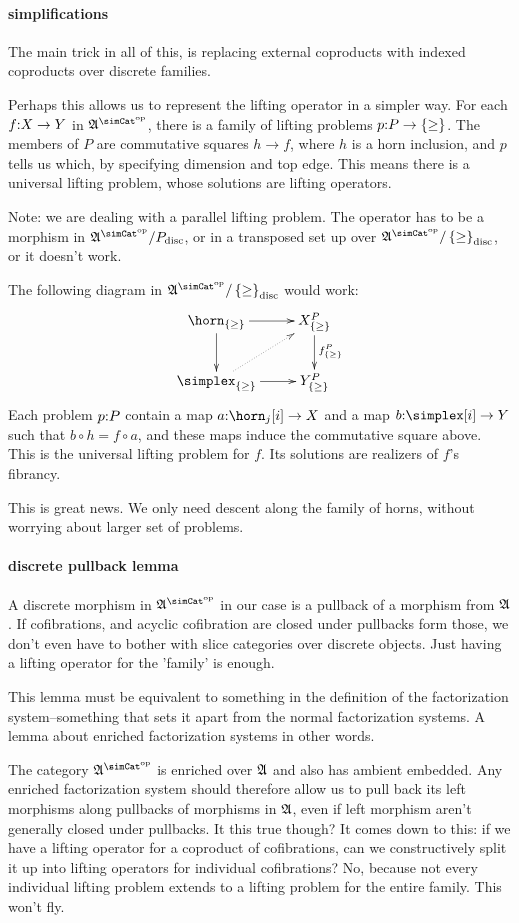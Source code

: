 \documentclass[csh.tex]{subfiles}
\begin{document}
\paragraph{simplifications}
The main trick in all of this, is replacing external coproducts with indexed coproducts over discrete families.

Perhaps this allows us to represent the lifting operator in a simpler way. For each $f\mathord : X\to Y$ in $\ambient\s$, there is a family of lifting problems $p\mathord : P\to \left\{\geq\right\}$. The members of $P$ are commutative squares $h\to f$, where $h$ is a horn inclusion, and $p$ tells us which, by specifying dimension and top edge. This means there is a universal lifting problem, whose solutions are lifting operators.
 
Note: we are dealing with a parallel lifting problem. The operator has to be a morphism in $\ambient\s/P\disc$, or in a transposed set up over $\ambient\s/\set\geq\disc$, or it doesn't work.

The following diagram in $\ambient\s/\set\geq\disc$ would work:
\[\xymatrix{
\horn_{\set\geq}\ar[d]\ar[r] & X^P_{\set\geq}\ar[d]^{f^P_{\set\geq}}\\
\simplex_{\set\geq}\ar[r]\ar@{.>}[ur] & Y^P_{\set\geq}
}\]
Each problem $p\mathord : P$ contain a map $a\of\horn_j[i]\to X$ and a map $b\of\simplex[i]\to Y$ such that $b\circ h = f\circ a$, and these maps induce the commutative square above. This is the universal lifting problem for $f$. Its solutions are realizers of $f$'s fibrancy.

This is great news. We only need descent along the family of horns, without worrying about larger set of problems.

\paragraph{discrete pullback lemma}
A discrete morphism in $\ambient\s$ in our case is a pullback of a morphism from $\mathfrak A$. If cofibrations, and acyclic cofibration are closed under pullbacks form those, we don't even have to bother with slice categories over discrete objects. Just having a lifting operator for the 'family' is enough.

This lemma must be equivalent to something in the definition of the factorization system--something that sets it apart from the normal factorization systems. A lemma about enriched factorization systems in other words.

The category $\ambient\s$ is enriched over $\mathfrak A$ and also has ambient embedded. Any enriched factorization system should therefore allow us to pull back its left morphisms along pullbacks of morphisms in $\mathfrak A$, even if left morphism aren't generally closed under pullbacks. It this true though? It comes down to this: if we have a lifting operator for a coproduct of cofibrations, can we constructively split it up into lifting operators for individual cofibrations? No, because not every individual lifting problem extends to a lifting problem for the entire family. This won't fly.
\end{document}
